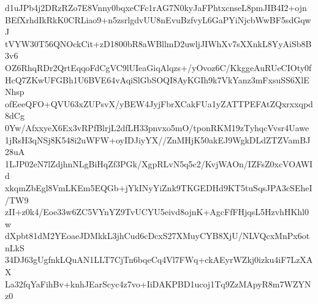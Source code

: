 d1uJPb4j2DRzRZo7E8Vnny0bqxeCFc1rAG7N0kyJaFPhtxcnseL8pmJIB4I2+ojn
BEfXrhdIkRkK0CRLiao9+n5zsrlgdvUU8nEvuBzfvyL6GaPYiNjcbWwBF5sdGqwJ
tVYW30T56QNOckCit+zD1800bR8aWBllmD2uwljJIWhXv7sXXnkL8YyAiSb8B3v6
OZ6RhqRDr2QrtEqqoFdCgVC9lUIeaGiqAlqzs+/yOvoz6C/KkggeAuRUeCIOty0f
HcQ7ZKwUFGBh1U6BVE64vAqiSlGbSOQI8AyKGIh9k7VkYanz3mFxsuSS6XlENhsp
ofEeeQFO+QVU63xZUPsvX/yBEW4JyjFbrXCakFUa1yZATTPEFAtZQxrxxqpd8dCg
0Yw/AfxxyeX6Ex3vRPfBlrjL2dfLH33pnvxo5mO/tponRKM19zTyhqcVvsr4Uawe
1jRsH3qNSj8K548i2uWFW+oyIDJiyYX//ZnMHjK50akEJ9WgkDLdZTZVamBJ28uA
1LJP02eN7lZdjhnNLgBiHqZf3PGk/XgpRLvN5q5c2/KvjWAOn/IZFsZ0xcVOAWId
xkqmZbEgl8VmLKEm5EQGb+jYkINyYiZnk9TKGEDHd9KT5tuSqsJPA3cSEheI/TW9
zII+z0k4/Eoe33w6ZC5VYnYZ9TvUCYU5eivd8ojnK+AgcFfFHjqsL5HzvhHKhl0w
dXpbt81dM2YEoaeJDMkkL3jhCud6cDcxS27XMuyCYB8XjU/NLVQcxMnPx6otnLkS
34DJ63gUgfnkLQuAN1LLT7CjTn6bqeCq4Vl7FWq+ckAEyrWZkj0izku4iF7LzXAX
La32fqYaFihBv+knhJEarScyc4z7vo+IiDAKPBD1ucoj1Tq9ZzMApyR8m7WZYNz0
